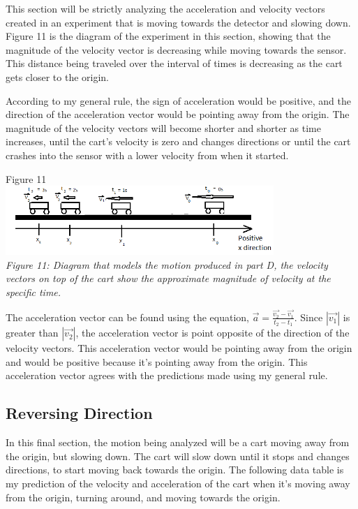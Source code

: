 \documentclass[aps,letterpaper,11pt]{revtex4}
\begin{document}
This section will be strictly analyzing the acceleration and velocity vectors created in an experiment that is moving towards the detector and slowing down. Figure 11 is the diagram of the experiment in this section, showing that the magnitude of the velocity vector is decreasing while moving towards the sensor. This distance being traveled over the interval of times is decreasing as the cart gets closer to the origin.

According to my general rule, the sign of acceleration would be positive, and the direction of the acceleration vector would be pointing away from the origin. The magnitude of the velocity vectors will become shorter and shorter as time increases, until the cart's velocity is zero and changes directions or until the cart crashes into the sensor with a lower velocity from when it started.  

\begin{center}
Figure 11\\
\includegraphics[width=4in]{VectorPartD.png}\\
\textit{Figure 11: Diagram that models the motion produced in part D, the velocity vectors on top of the cart show the approximate magnitude of velocity at the specific time.}
\end{center}

The acceleration vector can be found using the equation, $\vec{a} = \frac{\vec{v_2} - \vec{v_1}}{t_2 - t_1}$. Since $|\vec{v_1}|$ is greater than $|\vec{v_2}|$, the acceleration vector is point opposite of the direction of the velocity vectors. This acceleration vector would be pointing away from the origin and would be positive because it's pointing away from the origin. This acceleration vector agrees with the predictions made using my general rule.

\subsection{Reversing Direction}

In this final section, the motion being analyzed will be a cart moving away from the origin, but slowing down. The cart will slow down until it stops and changes directions, to start moving back towards the origin. The following data table is my prediction of the velocity and acceleration of the cart when it's moving away from the origin, turning around, and moving towards the origin.
\end{document}
